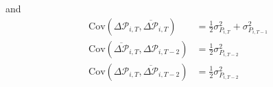 \documentclass[]{article}
\begin{document}
and
\begin{align*}
\text{Cov}(\Delta \mathcal{P}_{i,T},\overline{\Delta \mathcal{P}}_{i,T}) &= \frac{1}{2} \sigma^2_{P_{i,T}} +  \sigma^2_{P_{i,T-1}}\\
\text{Cov}(\overline{\Delta \mathcal{P}}_{i,T}, \Delta \mathcal{P}_{i,T-2}) &= \frac{1}{2} \sigma^2_{P_{i,T-2}} \\
\text{Cov}( \Delta \mathcal{P}_{i,T}, \overline{\Delta \mathcal{P}}_{i,T-2}) &=  \frac{1}{2} \sigma^2_{P_{i,T-2}} \\
\end{align*}
\end{document}
